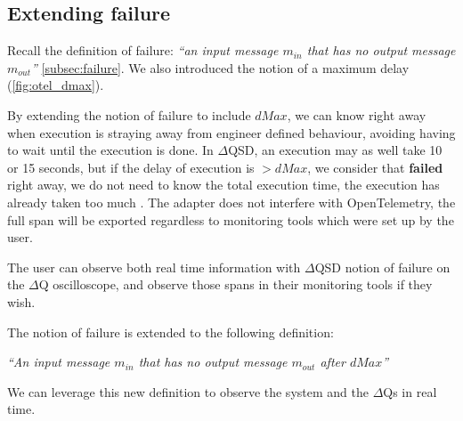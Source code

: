 \subsection{Extending failure}
   Recall the definition of failure: \textit{``an input message $m_{in}$ that has no output message $m_{out}$''} \cref{subsec:failure}. We also introduced the notion of a maximum delay (\cref{fig:otel_dmax}). 

   By extending the notion of failure to include $dMax$, we can know right away when execution is straying away from engineer defined behaviour, avoiding having to wait until the execution is done. In $\Delta$QSD, an execution may as well take 10 or 15 seconds, but if the delay of execution is $> dMax$, we consider that \textbf{failed} right away, we do not need to know the total execution time, the execution has already taken too much \cite{myo}. The adapter does not interfere with OpenTelemetry, the full span will be exported regardless to monitoring tools which were set up by the user. 

   The user can observe both real time information with $\Delta$QSD notion of failure on the $\Delta$Q oscilloscope, and observe those spans in their monitoring tools if they wish.

The notion of failure is extended to the following definition:
        \begin{center}
            \textit{``An input message $m_{in}$ that has no output message $m_{out}$ after $dMax$''} 
        \end{center}
    We can leverage this new definition to observe the system and the $\Delta$Qs in real time.

